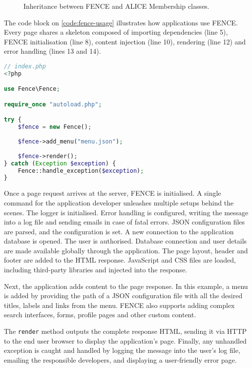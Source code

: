 \begin{figure}[htbp]
  \centering
  
  \caption{Inheritance between FENCE and ALICE Membership classes.}
  \label{fig:fence-inheritance}
\end{figure}

The code block on \autoref{code:fence-usage} illustrates how applications use FENCE. Every page shares a skeleton composed of importing dependencies (line 5), FENCE initialisation (line 8), content injection (line 10), rendering (line 12) and error handling (lines 13 and 14).

\begin{lstlisting}[language=PHP,label={code:fence-usage},caption={FENCE usage example.}]
// index.php
<?php

use Fence\Fence;

require_once "autoload.php";

try {
    $fence = new Fence();
    
    $fence->add_menu("menu.json");
    
    $fence->render();
} catch (Exception $exception) {
    Fence::handle_exception($exception);
}
\end{lstlisting}

Once a page request arrives at the server, FENCE is initialised. A single command for the application developer unleashes multiple setups behind the scenes. The logger is initialised. Error handling is configured, writing the message into a log file and sending emails in case of fatal errors. JSON configuration files are parsed, and the configuration is set. A new connection to the application database is opened. The user is authorised. Database connection and user details are made available globally through the application. The page layout, header and footer are added to the HTML response. JavaScript and CSS files are loaded, including third-party libraries and injected into the response.

Next, the application adds content to the page response. In this example, a menu is added by providing the path of a JSON configuration file with all the desired titles, labels and links from the menu. FENCE also supports adding complex search interfaces, forms, profile pages and other custom content.

The \texttt{render} method outputs the complete response HTML, sending it via HTTP to the end user browser to display the application's page. Finally, any unhandled exception is caught and handled by logging the message into the user's log file, emailing the responsible developers, and displaying a user-friendly error page.

